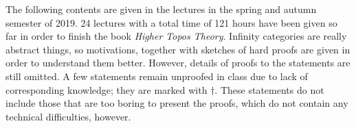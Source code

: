 The following contents are given in the lectures in the spring and autumn semester of 2019. 24 lectures with a total time of 121 hours 
have been given so far in order to finish the book \textit{Higher Topos Theory}. Infinity categories are really abstract things, 
so motivations, together with sketches of hard proofs are given in order to understand them better. 
However, details of proofs to the statements are still omitted. A few statements 
remain unproofed in class due to lack of corresponding knowledge; they are marked with $\dagger$. These statements do not include 
those that are too boring to present the proofs, which do not contain any technical difficulties, however. 
